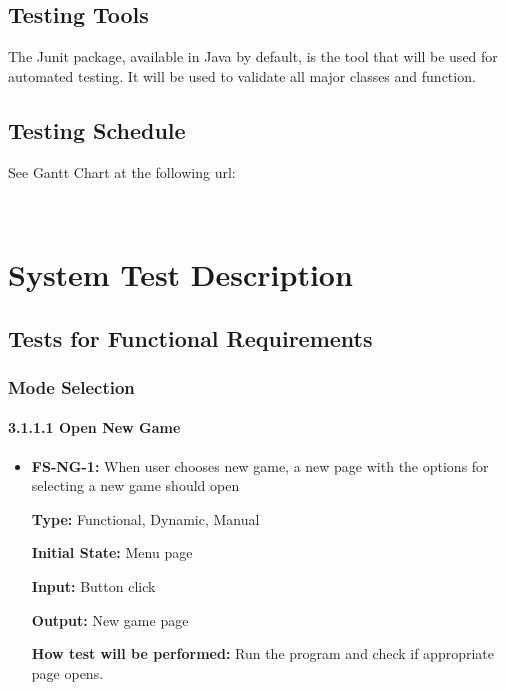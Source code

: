 \documentclass[12pt,letterpaper]{article}
\begin{document}
	\subsection{Testing Tools}
	The Junit package, available in Java by default, is the tool that will be used for automated testing. It will be used to validate all major classes and function.
	
	\subsection{Testing Schedule}
	See Gantt Chart at the following url:

\noindent {}\\

	\section{System Test Description}
	\subsection{Tests for Functional Requirements}
	\subsubsection{Mode Selection}
	\paragraph{3.1.1.1 Open New Game}
\begin{reqbox}
	\begin{itemize}

	\item \textbf{FS-NG-1: }When user chooses new game, a new page with the options for selecting a new game should open
	
	\textbf{Type: }Functional, Dynamic, Manual

	\textbf{Initial State: }Menu page

	\textbf{Input: }Button click

	\textbf{Output: }New game page

	\textbf{How test will be performed: }Run the program and check if appropriate page opens.
	\end{itemize}
\end{reqbox}
\end{document}
